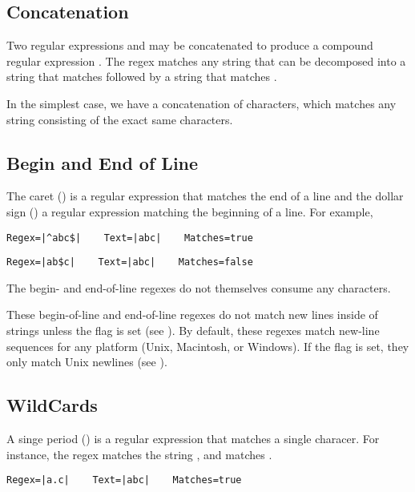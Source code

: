 \subsection{Concatenation}

Two regular expressions  and  may be
concatenated to produce a compound regular expression .
The regex  matches any string that can be decomposed into
a string that matches  followed by a string that matches
.

In the simplest case, we have a concatenation of characters, which
matches any string consisting of the exact same characters.  

\subsection{Begin and End of Line}


The caret (\code{\^{}}) is a regular expression that matches the end
of a line and the dollar sign (\code{\$}) a regular expression
matching the beginning of a line.  For example, 
%
\begin{verbatim}
Regex=|^abc$|    Text=|abc|    Matches=true
\end{verbatim}
%
\begin{verbatim}
Regex=|ab$c|    Text=|abc|    Matches=false
\end{verbatim}
%
The begin- and end-of-line regexes do not themselves consume any
characters.

These begin-of-line and end-of-line regexes do not match new lines
inside of strings unless the  flag is set (see
).  By default, these regexes match new-line
sequences for any platform (Unix, Macintosh, or Windows).  If the
 flag is set, they only match Unix newlines (see
).


\subsection{WildCards}\label{section:regex-wildcard}

A singe period () is a regular expression that matches a
single characer.  For instance, the regex  matches the string
, and  matches .%
%
\begin{verbatim}
Regex=|a.c|    Text=|abc|    Matches=true
\end{verbatim}
%

